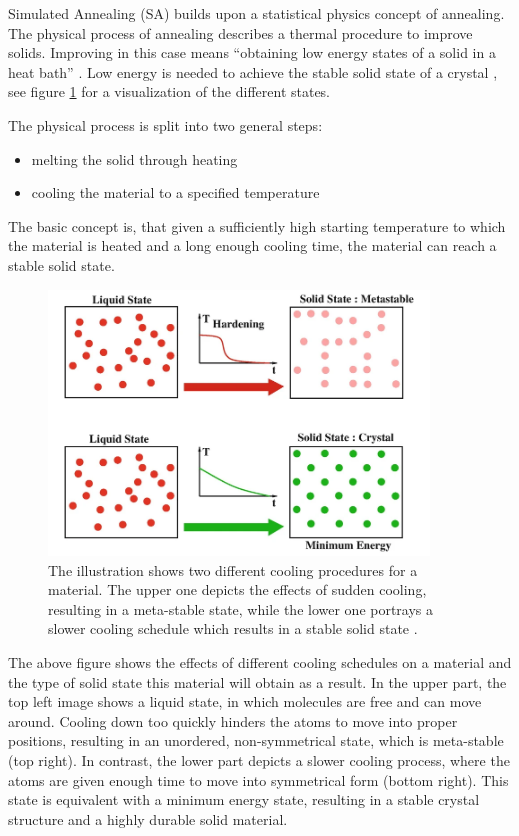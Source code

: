 Simulated Annealing (SA) builds upon a statistical physics concept of annealing.
The physical process of annealing describes a thermal procedure to improve solids.
Improving in this case means \enquote{obtaining low energy states of a solid in a heat bath} \cite{aarts_simulated_2005}.
Low energy is needed to achieve the stable solid state of a crystal \cite{delahaye_simulated_2019}, see figure \ref{fig:annealingIllustration} for a visualization of the different states.

The physical process is split into two general steps:
\begin{itemize}
	\item melting the solid through heating
	\item cooling the material to a specified temperature
\end{itemize}
The basic concept is, that given a sufficiently high starting temperature to which the material is heated and a long enough cooling time, the material can reach a stable solid state. 

\begin{figure}[h]
	\includegraphics[width=0.9\textwidth]{bilder/AnnealingIllustration.png}
	\caption{The illustration shows two different cooling procedures for a material. The upper one depicts the effects of sudden cooling, resulting in a meta-stable state, while the lower one portrays a slower cooling schedule which results in a stable solid state \cite{delahaye_simulated_2019}.}
	\label{fig:annealingIllustration}
\end{figure}


The above figure shows the effects of different cooling schedules on a material and the type of solid state this material will obtain as a result.
In the upper part, the top left image shows a liquid state, in which molecules are free and can move around.
Cooling down too quickly hinders the atoms to move into proper positions, resulting in an unordered, non-symmetrical state, which is meta-stable (top right).
In contrast, the lower part depicts a slower cooling process, where the atoms are given enough time to move into symmetrical form (bottom right).
This state is equivalent with a minimum energy state, resulting in a stable crystal structure and a highly durable solid material. 

